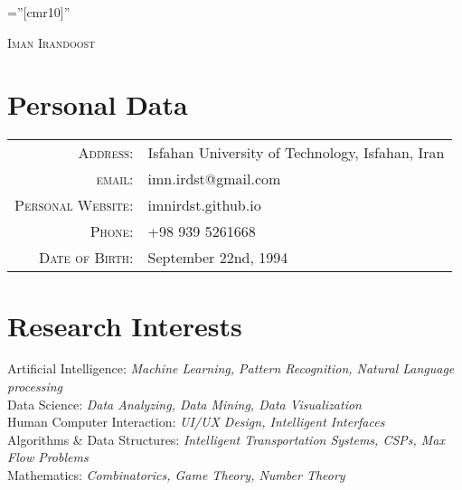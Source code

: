 \documentclass[a4paper,10pt]{article}
\begin{document}
	
	\pagestyle{empty} %
	
	\font\fb=''[cmr10]'' %
	
	\par{\centering
		{\Huge \textsc{Iman Irandoost}
		}\bigskip\par}
	
	\section{Personal Data}
		\begin{tabular}{rl}
			\textsc{Address:}   & Isfahan University of Technology, Isfahan, Iran \\
			\textsc{email:}     & imn.irdst@gmail.com \href{mailto:imn.irdst@gmail.com}{\footnotesize \faExternalLink}\\
			\textsc{Personal Website:}     & imnirdst.github.io \href{https://imnirdst.github.io/}{\footnotesize \faExternalLink}\\
			\textsc{Phone:}     & +98 939 5261668\\
			\textsc{Date of Birth:} & September 22nd, 1994
		\end{tabular}
	
	\section{Research Interests}
		\textbullet\textnormal{ Artificial Intelligence:}  \emph{\color{darkgray}\small Machine Learning, Pattern Recognition, Natural Language processing} \vspace{1 mm}  \\
		\textbullet\textnormal{ Data Science:} \emph{\color{darkgray}\small Data Analyzing, Data Mining, Data Visualization} \vspace{1 mm} \\
		\textbullet\textnormal{ Human Computer Interaction:} \emph{\color{darkgray}\small UI/UX Design, Intelligent Interfaces} \vspace{1 mm} \\
		\textbullet\textnormal{ Algorithms \& Data Structures:} \emph{\color{darkgray}\small Intelligent Transportation Systems, CSPs, Max Flow Problems} \vspace{1 mm} \\
		\textbullet\textnormal{ Mathematics:} \emph{\color{darkgray}\small Combinatorics, Game Theory, Number Theory}
\end{document}
